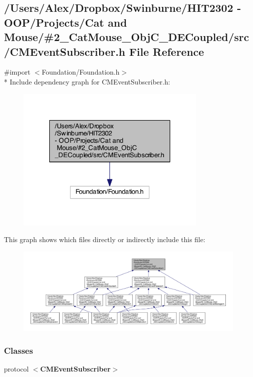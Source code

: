 \subsection{/\-Users/\-Alex/\-Dropbox/\-Swinburne/\-H\-I\-T2302 -\/ O\-O\-P/\-Projects/\-Cat and Mouse/\#2\-\_\-\-Cat\-Mouse\-\_\-\-Obj\-C\-\_\-\-D\-E\-Coupled/src/\-C\-M\-Event\-Subscriber.h File Reference}
\label{_c_m_event_subscriber_8h}
{\ttfamily \#import $<$Foundation/\-Foundation.\-h$>$}\\*
Include dependency graph for C\-M\-Event\-Subscriber.\-h\-:
\nopagebreak
\begin{figure}[H]
\begin{center}
\leavevmode
\includegraphics[width=262pt]{_c_m_event_subscriber_8h__incl}
\end{center}
\end{figure}
This graph shows which files directly or indirectly include this file\-:
\nopagebreak
\begin{figure}[H]
\begin{center}
\leavevmode
\includegraphics[width=350pt]{_c_m_event_subscriber_8h__dep__incl}
\end{center}
\end{figure}
\subsubsection*{Classes}
\begin{DoxyCompactItemize}
\item 
protocol {\bf $<$\-C\-M\-Event\-Subscriber$>$}
\end{DoxyCompactItemize}
